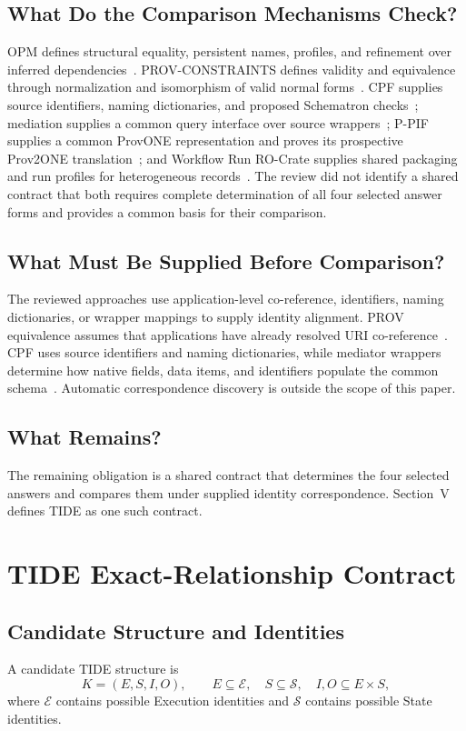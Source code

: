\documentclass[conference]{IEEEtran}
\theoremstyle{tideproposition}
\begin{document}
\subsection{What Do the Comparison Mechanisms Check?}
OPM defines structural equality, persistent names, profiles, and refinement over inferred dependencies~\cite{opm}. PROV-CONSTRAINTS defines validity and equivalence through normalization and isomorphism of valid normal forms~\cite{prov-constraints}. CPF supplies source identifiers, naming dictionaries, and proposed Schematron checks~\cite{cpf}; mediation supplies a common query interface over source wrappers~\cite{mediator}; P-PIF supplies a common ProvONE representation and proves its prospective Prov2ONE translation~\cite{ppif}; and Workflow Run RO-Crate supplies shared packaging and run profiles for heterogeneous records~\cite{wfrun}. The review did not identify a shared contract that both requires complete determination of all four selected answer forms and provides a common basis for their comparison.

\subsection{What Must Be Supplied Before Comparison?}
The reviewed approaches use application-level co-reference, identifiers, naming dictionaries, or wrapper mappings to supply identity alignment. PROV equivalence assumes that applications have already resolved URI co-reference~\cite{prov-constraints}. CPF uses source identifiers and naming dictionaries, while mediator wrappers determine how native fields, data items, and identifiers populate the common schema~\cite{cpf,mediator}. Automatic correspondence discovery is outside the scope of this paper.

\subsection{What Remains?}
The remaining obligation is a shared contract that determines the four selected answers and compares them under supplied identity correspondence. Section~V defines TIDE as one such contract.

\section{TIDE Exact-Relationship Contract}

\subsection{Candidate Structure and Identities}
A candidate TIDE structure is
\begin{equation}
K=(E,S,I,O),\qquad
E\subseteq\mathcal{E},\quad S\subseteq\mathcal{S},\quad
I,O\subseteq E\times S,
\label{eq:tide-structure}
\end{equation}
where $\mathcal{E}$ contains possible Execution identities and $\mathcal{S}$ contains possible State identities.
\end{document}

